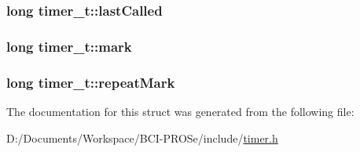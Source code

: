 \subsubsection[{\texorpdfstring{last\+Called}{lastCalled}}]{\setlength{\rightskip}{0pt plus 5cm}long timer\+\_\+t\+::last\+Called}\hypertarget{structtimer__t_aed72c4a4e2feff9b5f6abfcea6d7cc8f}{}\label{structtimer__t_aed72c4a4e2feff9b5f6abfcea6d7cc8f}
\subsubsection[{\texorpdfstring{mark}{mark}}]{\setlength{\rightskip}{0pt plus 5cm}long timer\+\_\+t\+::mark}\hypertarget{structtimer__t_a66d411aa2e553ff8194a1101cc3d7e6e}{}\label{structtimer__t_a66d411aa2e553ff8194a1101cc3d7e6e}
\subsubsection[{\texorpdfstring{repeat\+Mark}{repeatMark}}]{\setlength{\rightskip}{0pt plus 5cm}long timer\+\_\+t\+::repeat\+Mark}\hypertarget{structtimer__t_a211b11f8aa184adec6a21c1ec46d2526}{}\label{structtimer__t_a211b11f8aa184adec6a21c1ec46d2526}


The documentation for this struct was generated from the following file\+:\begin{DoxyCompactItemize}
\item 
D\+:/\+Documents/\+Workspace/\+B\+C\+I-\/\+P\+R\+O\+Se/include/\hyperlink{timer_8h}{timer.\+h}\end{DoxyCompactItemize}
